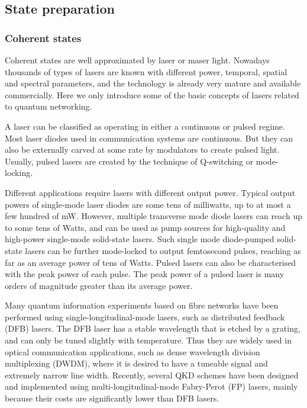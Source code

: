 \documentclass[aps, rmp, twocolumn, amsmath, amssymb, nofootinbib, superscriptaddress, longbibliography, floatfix, table-of-contents, eqsecnum]{revtex4-1}
\newcommand{\comment}[1]{{\color{blue}{\textbf{#1}}}}
\begin{document}
%
%

\subsection{State preparation} 

%
%

\subsubsection{Coherent states} 

\comment{Section complete}

Coherent states are well approximated by laser or maser light. Nowadays thousands of types of lasers are known with different power, temporal, spatial and spectral parameters, and the technology is already very mature and available commercially. Here we only introduce some of the basic concepts of lasers related to quantum networking.

A laser can be classified as operating in either a continuous or pulsed regime. Most laser diodes used in communication systems are continuous. But they can also be externally carved at some rate by modulators to create pulsed light. Usually, pulsed lasers are created by the technique of Q-switching or mode-locking.

Different applications require lasers with different output power. Typical output powers of single-mode laser diodes are some tens of milliwatts, up to at most a few hundred of mW. However, multiple transverse mode diode lasers can reach up to some tens of Watts, and can be used as pump sources for high-quality and high-power single-mode solid-state lasers. Such single mode diode-pumped solid-state lasers can be further mode-locked to output femtosecond pulses, reaching as far as an average power of tens of Watts. Pulsed lasers can also be characterised with the peak power of each pulse. The peak power of a pulsed laser is many orders of magnitude greater than its average power.

Many quantum information experiments based on fibre networks \cite{sun2016quantum} have been performed using single-longitudinal-mode lasers, such as distributed feedback (DFB) lasers. The DFB laser has a stable wavelength that is etched by a grating, and can only be tuned slightly with temperature. Thus they are widely used in optical communication applications, such as dense wavelength division multiplexing (DWDM), where it is desired to have a tuneable signal and extremely narrow line width. Recently, several QKD schemes \cite{choi2011quantum, wang2015experimental} have been designed and implemented using multi-longitudinal-mode Fabry-Perot (FP) lasers, mainly because their costs are significantly lower than DFB lasers.
\end{document}
